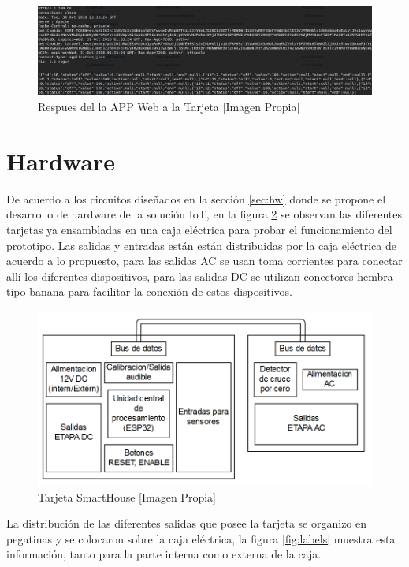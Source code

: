 \begin{figure}[H]
	\centering
	\caption{Respues del la APP Web a la Tarjeta [Imagen Propia]}
	\label{fig:httprqstesp}
	\includegraphics[width=0.8\linewidth]{Imagenes/HTTPRqstesp}
\end{figure}


\section{Hardware}

De acuerdo a los circuitos diseñados en la sección \ref{sec:hw} donde se propone el desarrollo de hardware de la solución IoT, en la figura \ref{fig:tarjeta} se observan las diferentes tarjetas ya ensambladas en una caja eléctrica para probar el funcionamiento del prototipo. Las salidas y entradas están están distribuidas por la caja eléctrica de acuerdo a lo propuesto, para las salidas AC se usan toma corrientes para conectar allí los diferentes dispositivos, para las salidas DC se utilizan conectores hembra tipo banana para facilitar la conexión de estos dispositivos.\\

\begin{figure}[H]
	\centering
	\caption{Tarjeta SmartHouse [Imagen Propia]}
	\label{fig:tarjeta}
	\includegraphics[width=0.6\linewidth]{Imagenes/Tarjeta}
\end{figure}


La distribución de las diferentes salidas que posee la tarjeta se organizo en pegatinas y se colocaron sobre la caja eléctrica, la figura \ref{fig:labels} muestra esta información, tanto para la parte interna como externa de la caja.\\

